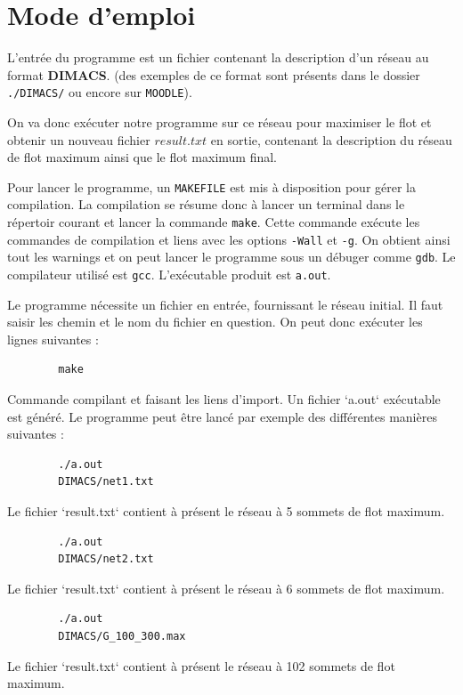 \documentclass[11pt, a4paper]{report}
\begin{document}
	\chapter{Mode d'emploi}
	
	L'entrée du programme est un fichier contenant la description d'un réseau au format \textbf{DIMACS}. (des exemples de ce format sont présents dans le dossier \verb|./DIMACS/| ou encore sur \verb*|MOODLE|).
	
	On va donc exécuter notre programme sur ce réseau pour maximiser le flot et obtenir un nouveau fichier $result.txt$ en sortie, contenant la description du réseau de flot maximum ainsi que le flot maximum final.
	
	Pour lancer le programme, un \verb|MAKEFILE| est mis à disposition pour gérer la compilation. La compilation se résume donc à lancer un terminal dans le répertoir courant et lancer la commande \verb|make|. Cette commande exécute les commandes de compilation et liens avec les options \verb|-Wall| et \verb|-g|. On obtient ainsi tout les warnings et on peut lancer le programme sous un débuger comme \verb|gdb|. Le compilateur utilisé est \verb|gcc|. L'exécutable produit est \verb|a.out|.
	
	Le programme nécessite un fichier en entrée, fournissant le réseau initial. Il faut saisir les chemin et le nom du fichier en question. On peut donc exécuter les lignes suivantes :
	\lstset{language=bash}
	\begin{lstlisting}
		make
	\end{lstlisting}
	Commande compilant et faisant les liens d'import. Un fichier `a.out` exécutable est généré. Le programme peut être lancé par exemple des différentes manières suivantes :
	
	\begin{lstlisting}
		./a.out
		DIMACS/net1.txt
	\end{lstlisting}
	Le fichier `result.txt` contient à présent le réseau à 5 sommets de flot maximum.
	
	\begin{lstlisting}
		./a.out
		DIMACS/net2.txt
	\end{lstlisting}
	Le fichier `result.txt` contient à présent le réseau à 6 sommets de flot maximum.
	
	\begin{lstlisting}
		./a.out
		DIMACS/G_100_300.max
	\end{lstlisting}
	Le fichier `result.txt` contient à présent le réseau à 102 sommets de flot maximum.
	
\end{document}
